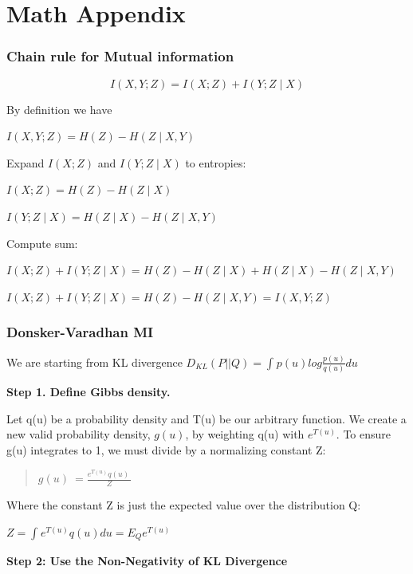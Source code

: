 \section{Math Appendix}
\label{math-appendix}

\subsubsection{Chain rule for Mutual information}
\begin{equation}
	I(X, Y ; Z) = I(X ; Z) + I(Y ; Z \mid X)
	\label{chain-rule-for-mutual-information-ix-y-z-ix-z-iy-z-x}
\end{equation}

By definition we have  

$I(X, Y ; Z) = H(Z) - H(Z \mid X, Y)$

Expand $I(X ; Z)$ and $I(Y ; Z \mid X)$ to entropies:

$I(X ; Z) = H(Z) - H(Z \mid X)$

$I(Y ; Z \mid X) = H(Z \mid X) - H(Z \mid X, Y)$

Compute sum:

$I(X ; Z) + I(Y ; Z \mid X) = H(Z) - H(Z \mid X) + H(Z \mid X) - H(Z \mid X, Y)$


$I(X ; Z) + I(Y ; Z \mid X) = H(Z) - H(Z \mid X, Y) = I(X, Y ; Z)$

\subsubsection{Donsker-Varadhan MI}\label{donsker-varadhan-mi}

We are starting from KL divergence $D_{KL}(P || Q) =  \int_{}^{}p(u) log \frac{p(u)}{q(u)}du$
 
\textbf{Step 1. Define Gibbs density.}

Let q(u) be a probability density and T(u) be our arbitrary function. We create a new valid probability density, $g(u)$, by weighting q(u) with $e^{T(u)}$. To ensure g(u) integrates to 1, we must divide by a normalizing constant Z:

\begin{quote}
$g(u)\  =  \frac{e^{T(u)}q(u)\ }{Z}$
\end{quote}

Where the constant Z is just the expected value over the distribution Q:


$Z = \int_{}^{}e^{T(u)}q(u) du =  E_{Q} e^{T(u)}$


\textbf{Step 2: Use the Non-Negativity of KL Divergence}

